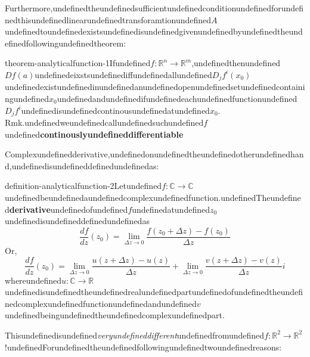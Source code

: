 Furthermore,undefinedtheundefinedsufficientundefinedconditionundefinedforundefinedthisundefinedlinearundefinedtransforamtionundefined$A$undefinedtoundefinedexistsundefinedisundefinedgivenundefinedbyundefinedtheundefinedfollowingundefinedtheorem:

\begin{mystthmtheorem}{}{theorem-analyticalfunction-1}Ifundefined$f:\mathbb{R}^n\to \mathbb{R}^m$,undefinedthenundefined$Df(a)$undefinedeixstsundefinediffundefinedallundefined$D_jf^{i}(x_0)$undefinedexistundefinedinundefinedanundefinedopenundefinedsetundefinedcontainingundefined$x_0$undefinedandundefinedifundefinedeachundefinedfunctionundefined$D_jf^i$undefinedisundefinedcontinousundefinedatundefined$x_0$.
Rmk.undefinedweundefinedcallundefinedsuchundefined$f$undefined\textbf{continouslyundefineddifferentiable}

\end{mystthmtheorem}
Complexundefinedderivative,undefinedonundefinedtheundefinedotherundefinedhand,undefinedisundefineddefinedundefinedas:

\begin{mystthmdefinition}{}{definition-analyticalfunction-2}Letundefined$f:\mathbb{C} \to \mathbb{C}$undefinedbeundefinedaundefinedcomplexundefinedfunction.undefinedTheundefined\textbf{derivative}undefinedofundefined$f$undefinedatundefined$z_0$undefinedisundefineddefinedundefinedas
\begin{equation}
\frac{df}{dz}({z_0})= \lim_{\Delta z\to 0}\frac{f(z_0 + \Delta z) -f(z_0)}{\Delta z}
\end{equation}
Or,
\begin{equation}
\frac{df}{dz}({z_0})= \lim_{\Delta z\to 0}\frac{u(z+\Delta z) -u(z)}{\Delta z} + \lim_{\Delta z\to 0}\frac{v(z+\Delta z) -v(z)}{\Delta z} i
\end{equation}
whereundefined$u : \mathbb{C} \to \mathbb{R}$undefinedisundefinedtheundefinedrealundefinedpartundefinedofundefinedtheundefinedcomplexundefinedfunctionundefinedandundefined$v$undefinedbeingundefinedtheundefinedcomplexundefinedpart.

\end{mystthmdefinition}
Thisundefinedisundefined\textit{veryundefineddifferent}undefinedfromundefined$f:\mathbb{R}^2 \to \mathbb{R}^2$!undefinedForundefinedtheundefinedfollowingundefinedtwoundefinedreasons:

